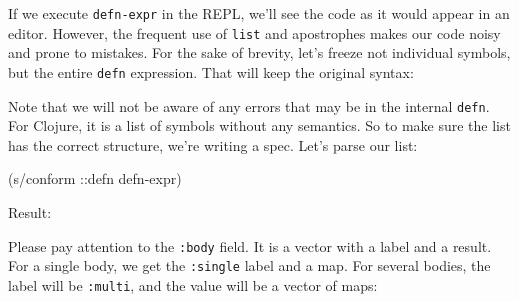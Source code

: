 If we execute \verb|defn-expr| in the REPL, we'll see the code as it would appear in an editor. However, the frequent use of \verb|list| and apostrophes makes our code noisy and prone to mistakes. For the sake of brevity, let's freeze not individual symbols, but the entire \verb|defn| expression. That will keep the original syntax:

\begin{english}
\end{english}

Note that we will not be aware of any errors that may be in the internal \verb|defn|. For Clojure, it is a list of symbols without any semantics. So to make sure the list has the correct structure, we're writing a spec. Let's parse our list:

\begin{english}
  \begin{clojure}
(s/conform ::defn defn-expr)
  \end{clojure}
\end{english}

\noindent
Result:

\ifx\DEVICETYPE\MOBILE

\begin{english}
\end{english}

\else

\begin{english}
\end{english}

\fi

Please pay attention to the \verb|:body| field. It is a vector with a label and a result. For a single body, we get the \verb|:single| label and a map. For several bodies, the label will be \verb|:multi|, and the value will be a vector of maps:


